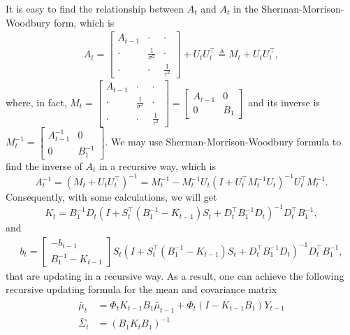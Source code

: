 It is easy to find the relationship between $A_{t}$ and  $A_{t}$ in the Sherman-Morrison-Woodbury form, which is 
\begin{align*} A_{t} = 
\begin{bmatrix}
A_{t-1} & \cdot & \cdot  \\ \cdot &\frac{1}{\sigma^2} &\cdot  \\ \cdot  & \cdot  & \frac{1}{\tau^2} 
\end{bmatrix} + U_{t}U_{t}^\top \triangleq M_{t}  + U_{t}U_{t}^\top,
\end{align*}
where, in fact, $M_{t} = \begin{bmatrix}
A_{t-1} & \cdot & \cdot  \\ \cdot &\frac{1}{\sigma^2} &\cdot  \\ \cdot  & \cdot  & \frac{1}{\tau^2}
\end{bmatrix}  = \begin{bmatrix}
A_{t-1} & 0 \\ 0 & B_1
\end{bmatrix}$ 
and its inverse is $M_{t}^{-1} =\begin{bmatrix}
A_{t-1}^{-1} & 0 \\ 0 & B_1^{-1}
\end{bmatrix}$. We may use Sherman-Morrison-Woodbury formula to find the inverse of $A_{t}$ in a recursive way, which is 
\begin{equation}
A_{t}^{-1} = \left(M_{t}+U_{t}U_{t}^\top\right)^{-1}= M_{t}^{-1}-M_{t}^{-1}U_{t}\left(I+U_{t}^\top M_{t}^{-1}U_{t}\right)^{-1}U_{t}^\top M_{t}^{-1}.
\end{equation}
Consequently, with some calculations, we will get 
\begin{equation}\label{OUupdatingK}
K_{t} =B_1^{-1}D_{t} \left(I+ S_{t}^\top \left(B_1^{-1} - K_{t-1}\right)  S_{t} +D_{t}^\top B_1^{-1}D_{t}  \right)^{-1}  D_{t}^\top B_1^{-1},
\end{equation}
and
\begin{align*}
b_{t} = \begin{bmatrix}
-b_{t-1} \\ B_1^{-1}-K_{t-1} 
\end{bmatrix}  S_{t} \left(I+ S_{t}^\top \left(B_1^{-1} - K_{t-1}\right)  S_{t} +D_{t}^\top B_1^{-1}D_{t}  \right)^{-1} D_{t}^\top B_1^{-1}, 
\end{align*}
that are updating in a recursive way. As a result, one can achieve the following recursive updating formula for the mean and covariance matrix 
\begin{align}
\begin{split}
\bar{\mu}_{t}&=\Phi_{t} K_{t-1}B_1\bar{\mu}_{t-1} + \Phi_{t} \left(I-K_{t-1}B_1\right)Y_{t-1}\\
\bar{\Sigma}_{t}&=\left(B_1K_{t}B_1\right)^{-1}
\end{split}
\end{align}
